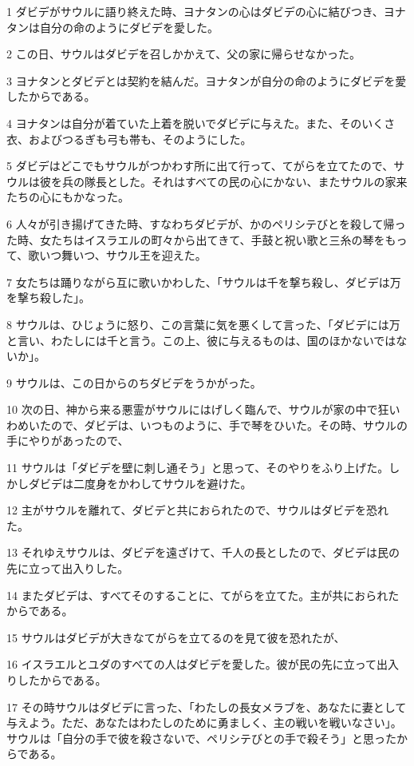 \par 1 ダビデがサウルに語り終えた時、ヨナタンの心はダビデの心に結びつき、ヨナタンは自分の命のようにダビデを愛した。
\par 2 この日、サウルはダビデを召しかかえて、父の家に帰らせなかった。
\par 3 ヨナタンとダビデとは契約を結んだ。ヨナタンが自分の命のようにダビデを愛したからである。
\par 4 ヨナタンは自分が着ていた上着を脱いでダビデに与えた。また、そのいくさ衣、およびつるぎも弓も帯も、そのようにした。
\par 5 ダビデはどこでもサウルがつかわす所に出て行って、てがらを立てたので、サウルは彼を兵の隊長とした。それはすべての民の心にかない、またサウルの家来たちの心にもかなった。
\par 6 人々が引き揚げてきた時、すなわちダビデが、かのペリシテびとを殺して帰った時、女たちはイスラエルの町々から出てきて、手鼓と祝い歌と三糸の琴をもって、歌いつ舞いつ、サウル王を迎えた。
\par 7 女たちは踊りながら互に歌いかわした、「サウルは千を撃ち殺し、ダビデは万を撃ち殺した」。
\par 8 サウルは、ひじょうに怒り、この言葉に気を悪くして言った、「ダビデには万と言い、わたしには千と言う。この上、彼に与えるものは、国のほかないではないか」。
\par 9 サウルは、この日からのちダビデをうかがった。
\par 10 次の日、神から来る悪霊がサウルにはげしく臨んで、サウルが家の中で狂いわめいたので、ダビデは、いつものように、手で琴をひいた。その時、サウルの手にやりがあったので、
\par 11 サウルは「ダビデを壁に刺し通そう」と思って、そのやりをふり上げた。しかしダビデは二度身をかわしてサウルを避けた。
\par 12 主がサウルを離れて、ダビデと共におられたので、サウルはダビデを恐れた。
\par 13 それゆえサウルは、ダビデを遠ざけて、千人の長としたので、ダビデは民の先に立って出入りした。
\par 14 またダビデは、すべてそのすることに、てがらを立てた。主が共におられたからである。
\par 15 サウルはダビデが大きなてがらを立てるのを見て彼を恐れたが、
\par 16 イスラエルとユダのすべての人はダビデを愛した。彼が民の先に立って出入りしたからである。
\par 17 その時サウルはダビデに言った、「わたしの長女メラブを、あなたに妻として与えよう。ただ、あなたはわたしのために勇ましく、主の戦いを戦いなさい」。サウルは「自分の手で彼を殺さないで、ペリシテびとの手で殺そう」と思ったからである。
